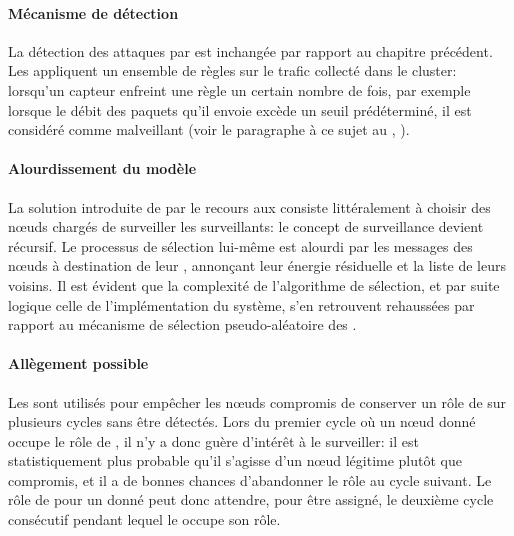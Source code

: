 \paragraph{Mécanisme de détection}
La détection des attaques par \dds est inchangée par rapport au chapitre précédent.
Les \cns appliquent un ensemble de règles sur le trafic collecté dans le cluster: lorsqu'un capteur enfreint une règle un certain nombre de fois, par exemple lorsque le débit des paquets qu'il envoie excède un seuil prédéterminé, il est considéré comme malveillant (voir le paragraphe à ce sujet au , ).

\paragraph{Alourdissement du modèle}
La solution introduite de par le recours aux \vns consiste littéralement à choisir des nœuds chargés de surveiller les surveillants: le concept de surveillance devient récursif.
Le processus de sélection lui-même est alourdi par les messages des nœuds à destination de leur \ch, annonçant leur énergie résiduelle et la liste de leurs voisins.
Il est évident que la complexité de l'algorithme de sélection, et par suite logique celle de l'implémentation du système, s'en retrouvent rehaussées par rapport au mécanisme de sélection pseudo-aléatoire des \cns.

\paragraph{Allègement possible}
Les \vns sont utilisés pour empêcher les nœuds compromis de conserver un rôle de \cn sur plusieurs cycles sans être détectés.
Lors du premier cycle où un nœud donné occupe le rôle de \cn, il n'y a donc guère d'intérêt à le surveiller: il est statistiquement plus probable qu'il s'agisse d'un nœud légitime plutôt que compromis, et il a de bonnes chances d'abandonner le rôle au cycle suivant.
Le rôle de \vn pour un \cn donné peut donc attendre, pour être assigné, le deuxième cycle consécutif pendant lequel le \cn occupe son rôle.


